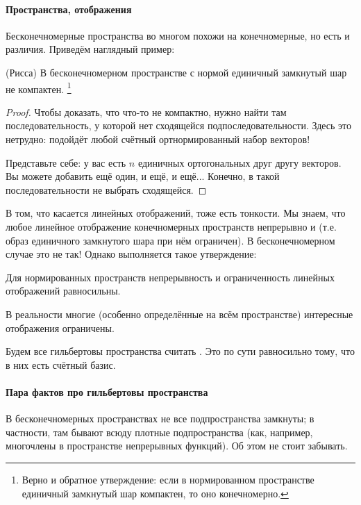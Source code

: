 \documentclass{trlnotes}
\begin{document}
    \paragraph{Пространства, отображения}
    Бесконечномерные пространства во многом похожи на конечномерные, но есть и различия. Приведём наглядный пример:

    \begin{thm}(Рисса)
        В бесконечномерном пространстве с нормой единичный замкнутый шар не компактен. \footnote{Верно и обратное утверждение: если в нормированном пространстве единичный замкнутый шар компактен, то оно конечномерно.}
        \begin{proof}
            Чтобы доказать, что что-то не компактно, нужно найти там последовательность, у которой нет сходящейся подпоследовательности. Здесь это нетрудно: подойдёт любой счётный ортнормированный набор векторов!

            Представьте себе: у вас есть $n$ единичных ортогональных друг другу векторов. Вы можете добавить ещё один, и ещё, и ещё... Конечно, в такой последовательности не выбрать сходящейся.
        \end{proof}
    \end{thm}

    В том, что касается линейных отображений, тоже есть тонкости. Мы знаем, что любое линейное отображение конечномерных пространств непрерывно и  (т.е. образ единичного замкнутого шара при нём ограничен). В бесконечномерном случае это не так! Однако выполняется такое утверждение:

    \begin{st}
        Для нормированных пространств непрерывность и ограниченность линейных отображений равносильны.
    \end{st}

    В реальности многие (особенно определённые на всём пространстве) интересные отображения ограничены.

    \begin{rem}
        Будем все гильбертовы пространства считать . Это по сути равносильно тому, что в них есть счётный базис.
    \end{rem}


    \paragraph{Пара фактов про гильбертовы пространства}

    \begin{rem}
        В бесконечномерных пространствах не все подпространства замкнуты; в частности, там бывают всюду плотные подпространства (как, например, многочлены в пространстве непрерывных функций). Об этом не стоит забывать.
    \end{rem}
\end{document}
